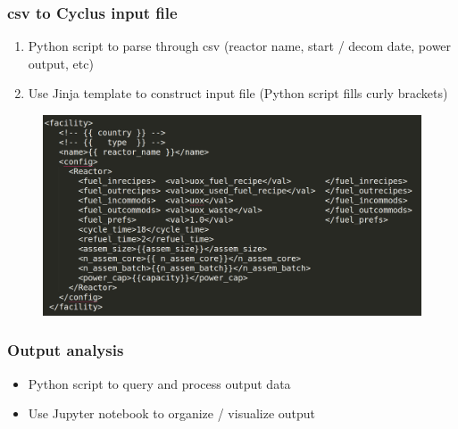 \begin{frame}
    \frametitle{csv to Cyclus input file}
    \begin{enumerate}
        \item Python script to parse through csv (reactor name, start / decom date, power output, etc)
        \item Use Jinja template to construct input file (Python script fills curly brackets)
    \end{enumerate}
    \begin{figure}[htbp!]
        \begin{center}
                \includegraphics[width=.6\textwidth]{./images/reactor_template.png}
        \end{center}
    \end{figure}
\end{frame}

\begin{frame}
    \frametitle{Output analysis}
    \begin{itemize}
        \item Python script to query and process output data
        \item Use Jupyter notebook to organize / visualize output
    \end{itemize}

\end{frame}

